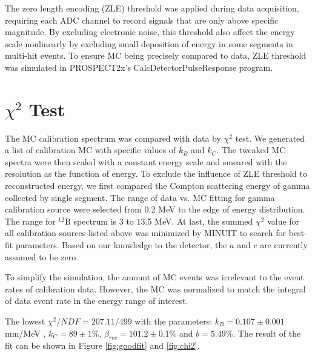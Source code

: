 The zero length encoding (ZLE) threshold was applied during data acquisition, requiring each ADC channel to record signals that are only above specific magnitude. 
By excluding electronic noise, this threshold also affect the energy scale nonlinearly by excluding small deposition of energy in some segments in multi-hit events. 
To ensure MC being precisely compared to data, ZLE threshold was simulated in PROSPECT2x's CalcDetectorPulseResponse program.

\section{$\chi^2$ Test}
The MC calibration spectrum was compared with data by $\chi^2$ test. 
We generated a list of calibration MC with specific values of $k_B$ and $k_C$. 
The tweaked MC spectra were then scaled with a constant energy scale and smeared with the resolution as the function of energy.
To exclude the influence of ZLE threshold to reconstructed energy, we first compared the Compton scattering energy of gamma collected by single segment. 
The range of data vs. MC fitting for gamma calibration source were selected from 0.2 MeV to the edge of energy distribution. 
The range for $^{12}$B spectrum is 3 to 13.5 MeV. 
At last, the summed $\chi^2$ value for all calibration sources listed above was minimized by MINUIT to search for best-fit parameters. 
Based on our knowledge to the detector, the $a$ and $c$ are currently assumed to be zero. 

To simplify the simulation, the amount of MC events was irrelevant to the event rates of calibration data. 
However, the MC was normalized to match the integral of data event rate in the energy range of interest. 

The lowest $\chi^2/NDF = 207.11/499$ with the parameters: $k_B = 0.107 \pm 0.001$ mm/MeV , $k_C = 89 \pm 1\%$, $\beta_{rec} = 101.2 \pm 0.1\%$ and $b = 5.49\%$. The result of the fit can be shown in Figure \ref{fig:goodfit} and \ref{fig:chi2}.

